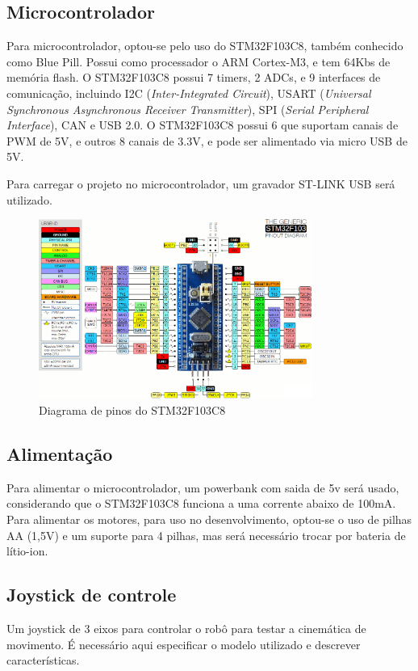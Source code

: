 \subsection{Microcontrolador}

Para microcontrolador, optou-se pelo uso do  STM32F103C8, também conhecido como Blue Pill.
Possui como processador o ARM Cortex-M3, e tem 64Kbs de memória flash. 
O STM32F103C8 possui 7 timers, 2 ADCs, e 9 interfaces de comunicação, incluindo
I2C (\textit{Inter-Integrated Circuit}), USART (\textit{Universal Synchronous
Asynchronous Receiver Transmitter}), SPI (\textit{Serial Peripheral Interface}),
CAN e USB 2.0.
O STM32F103C8 possui 6 que suportam canais de PWM de 5V, e outros 8 canais de 3.3V,  e pode ser alimentado via micro
USB de 5V.

Para carregar o projeto no microcontrolador, um gravador ST-LINK USB será utilizado.

\begin{figure}[h]
	\centering
	\includegraphics[width=0.8\textwidth]{figures/stm32f1_pinout}
	\caption{Diagrama de pinos do STM32F103C8}
\end{figure}

\subsection{Alimentação}
Para alimentar o microcontrolador, um powerbank com saida de 5v será usado, considerando que o STM32F103C8 funciona a
uma corrente abaixo de 100mA. Para alimentar os motores, para uso no desenvolvimento, optou-se o uso de pilhas AA (1,5V)
e um suporte para 4 pilhas, mas será necessário trocar por bateria de lítio-ion.

\subsection{Joystick de controle}
Um joystick de 3 eixos para controlar o robô para testar a cinemática de movimento.
{\color{red} É necessário aqui especificar o modelo utilizado e descrever características.}

